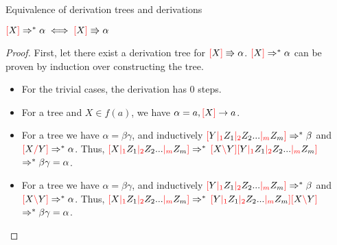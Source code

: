 \documentclass[main.tex]{subfiles}
\begin{document}
\begin{prop}
    Equivalence of derivation trees and derivations

    $ \lb X \rb \gsteps \alpha \iff \lb X \rb \tderiv \alpha $
\end{prop}
\begin{proof}
    First, let there exist a derivation tree for $ \lb X \rb \tderiv \alpha $.
    $\lb X \rb \gsteps \alpha$ can be proven by induction over constructing
    the tree.
    \begin{itemize}
        \item For the trivial cases, the derivation has 0 steps.
        \item For a tree
            and $X \in f(a)$, we have $\alpha = a, \lb X \rb \gderiv a$.
        \item For a tree
            we have $\alpha = \beta \gamma$, and inductively
            $\lb Y \mci{1} Z_1 \mci{2} Z_2 ... \mci{m} Z_m \rb \gsteps \beta$ and
            $\lb X \rc Y \rb \gsteps \alpha$. Thus,
            $\lb X \mci{1} Z_1 \mci{2} Z_2 ... \mci{m} Z_m \rb \gsteps$
            $\lb X \lc Y \rb \lb Y \mci{1} Z_1 \mci{2} Z_2 ... \mci{m} Z_m \rb$
            $ \gsteps \beta \gamma = \alpha$.
        \item For a tree
            we have $\alpha = \beta \gamma$, and inductively
            $\lb Y \mci{1} Z_1 \mci{2} Z_2 ... \mci{m} Z_m \rb \gsteps \beta$ and
            $\lb X \lc Y \rb \gsteps \alpha$. Thus,
            $\lb X \mci{1} Z_1 \mci{2} Z_2 ... \mci{m} Z_m \rb \gsteps$
            $\lb Y \mci{1} Z_1 \mci{2} Z_2 ... \mci{m} Z_m \rb \lb X \lc Y \rb$
            $ \gsteps \beta \gamma = \alpha$.
    \end{itemize}


\end{proof}
\end{document}
